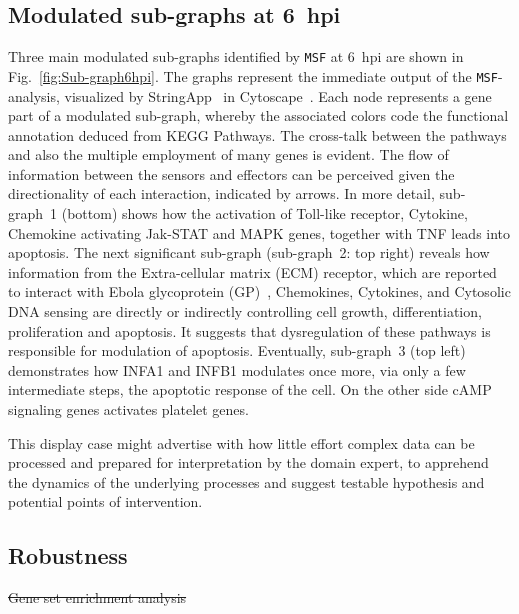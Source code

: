 \documentclass[10pt,a4paper,twocolumn]{article}
\begin{document}
	\subsection*{Modulated sub-graphs at 6~hpi}
	
	Three main modulated sub-graphs identified by \texttt{MSF} at
        6~hpi are shown in Fig.~\ref{fig:Sub-graph6hpi}. The graphs
        represent the immediate output of the \texttt{MSF}-analysis,
        visualized by StringApp~\cite{StringApp} in
        Cytoscape~\cite{Cyto}. Each node represents a gene part of a
        modulated sub-graph, whereby the associated colors code the
        functional annotation deduced from KEGG Pathways. The
        cross-talk between the pathways and also the multiple
        employment of many genes is evident. The flow of information
        between the sensors and effectors can be perceived given the
        directionality of each interaction, indicated by arrows.  In
        more detail, sub-graph~1 (bottom) shows how the activation of
        Toll-like receptor, Cytokine, Chemokine activating Jak-STAT
        and MAPK genes, together with TNF leads into apoptosis. The
        next significant sub-graph (sub-graph~2: top right) reveals
        how information from the Extra-cellular matrix (ECM) receptor,
        which are reported to interact with Ebola glycoprotein
        (GP)~\cite{Veljkovic}, Chemokines, Cytokines, and Cytosolic
        DNA sensing are directly or indirectly controlling cell
        growth, differentiation, proliferation and apoptosis. It
        suggests that dysregulation of these pathways is responsible
        for modulation of apoptosis. Eventually, sub-graph~3 (top
        left) demonstrates how INFA1 and INFB1 modulates once more,
        via only a few intermediate steps, the apoptotic response of
        the cell. On the other side cAMP signaling genes activates
        platelet genes.
	
	This display case might advertise with how little effort
        complex data can be processed and prepared for
          interpretation by the domain expert, to apprehend the dynamics of the underlying processes
        and suggest testable hypothesis and potential points of
        intervention.
	
	\subsection*{Robustness}\sout{Gene set enrichment analysis}
	
\end{document}
